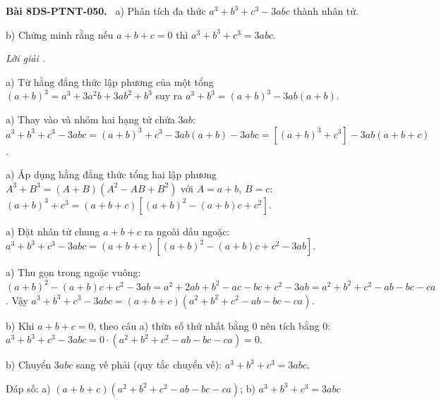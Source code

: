 \documentclass[12pt,a4paper]{article}
\newenvironment{problem}[1][]{\par\medskip\noindent\textbf{Bài #1.}\ }{\par}
\newenvironment{solution}[1][]{\par\noindent\textit{Lời giải #1.}\par}{\par}
\begin{document}
\begin{problem}[8DS-PTNT-050]
a) Phân tích đa thức $a^3 + b^3 + c^3 - 3abc$ thành nhân tử.

b) Chứng minh rằng nếu $a + b + c = 0$ thì $a^3 + b^3 + c^3 = 3abc$.

\begin{solution}
a) Từ hằng đẳng thức lập phương của một tổng $(a + b)^3 = a^3 + 3a^2b + 3ab^2 + b^3$ suy ra $a^3 + b^3 = (a + b)^3 - 3ab(a + b)$.

a) Thay vào và nhóm hai hạng tử chứa $3ab$: $a^3 + b^3 + c^3 - 3abc = (a + b)^3 + c^3 - 3ab(a + b) - 3abc = \left[(a + b)^3 + c^3\right] - 3ab(a + b + c)$.

a) Áp dụng hằng đẳng thức tổng hai lập phương $A^3 + B^3 = (A + B)(A^2 - AB + B^2)$ với $A = a + b$, $B = c$: $(a + b)^3 + c^3 = (a + b + c)\left[(a + b)^2 - (a + b)c + c^2\right]$.

a) Đặt nhân tử chung $a + b + c$ ra ngoài dấu ngoặc: $a^3 + b^3 + c^3 - 3abc = (a + b + c)\left[(a + b)^2 - (a + b)c + c^2 - 3ab\right]$.

a) Thu gọn trong ngoặc vuông: $(a + b)^2 - (a + b)c + c^2 - 3ab = a^2 + 2ab + b^2 - ac - bc + c^2 - 3ab = a^2 + b^2 + c^2 - ab - bc - ca$. Vậy $a^3 + b^3 + c^3 - 3abc = (a + b + c)(a^2 + b^2 + c^2 - ab - bc - ca)$.

b) Khi $a + b + c = 0$, theo câu a) thừa số thứ nhất bằng $0$ nên tích bằng $0$: $a^3 + b^3 + c^3 - 3abc = 0 \cdot (a^2 + b^2 + c^2 - ab - bc - ca) = 0$.

b) Chuyển $3abc$ sang vế phải (quy tắc chuyển vế): $a^3 + b^3 + c^3 = 3abc$.

Đáp số: a) $\boxed{(a + b + c)(a^2 + b^2 + c^2 - ab - bc - ca)}$; b) $\boxed{a^3 + b^3 + c^3 = 3abc}$
\end{solution}
\end{problem}
\end{document}
